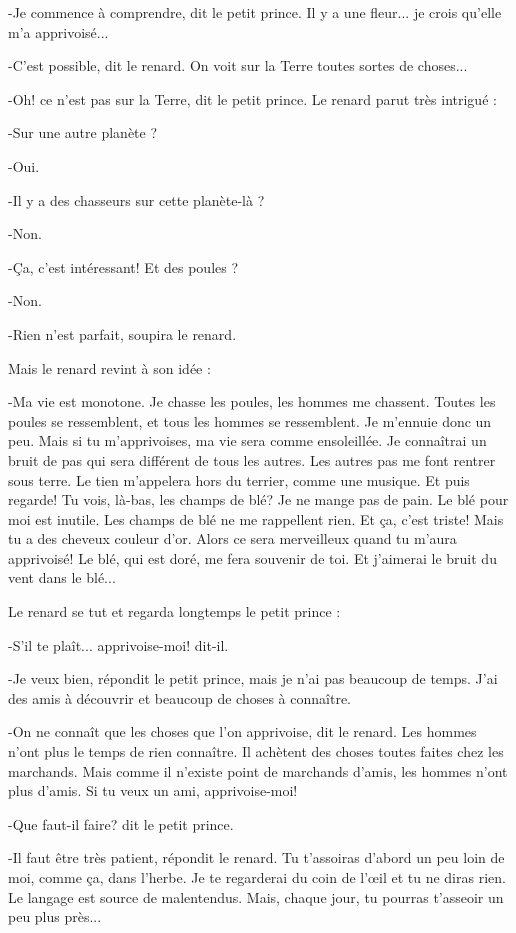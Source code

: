 \documentclass{report}
\begin{document}
-Je commence à comprendre, dit le petit prince. Il y a une fleur... je crois qu'elle m'a apprivoisé...

-C'est possible, dit le renard. On voit sur la Terre toutes sortes de choses...

-Oh! ce n'est pas sur la Terre, dit le petit prince. Le renard parut très intrigué :

-Sur une autre planète ?

-Oui.

-Il y a des chasseurs sur cette planète-là ?

-Non.

-Ça, c'est intéressant! Et des poules ?

-Non.

-Rien n'est parfait, soupira le renard.

Mais le renard revint à son idée :

-Ma vie est monotone. Je chasse les poules, les hommes me chassent. Toutes les poules se ressemblent, et tous les hommes se ressemblent. Je m'ennuie donc un peu. Mais si tu m'apprivoises, ma vie sera comme ensoleillée. Je connaîtrai un bruit de pas qui sera différent de tous les autres. Les autres pas me font rentrer sous terre. Le tien m'appelera hors du terrier, comme une musique. Et puis regarde! Tu vois, là-bas, les champs de blé? Je ne mange pas de pain. Le blé pour moi est inutile. Les champs de blé ne me rappellent rien. Et ça, c'est triste! Mais tu a des cheveux couleur d'or. Alors ce sera merveilleux quand tu m'aura apprivoisé! Le blé, qui est doré, me fera souvenir de toi. Et j'aimerai le bruit du vent dans le blé...

Le renard se tut et regarda longtemps le petit prince :

-S'il te plaît... apprivoise-moi! dit-il.

-Je veux bien, répondit le petit prince, mais je n'ai pas beaucoup de temps. J'ai des amis à découvrir et beaucoup de choses à connaître.

-On ne connaît que les choses que l'on apprivoise, dit le renard. Les hommes n'ont plus le temps de rien connaître. Il achètent des choses toutes faites chez les marchands. Mais comme il n'existe point de marchands d'amis, les hommes n'ont plus d'amis. Si tu veux un ami, apprivoise-moi!

-Que faut-il faire? dit le petit prince.

-Il faut être très patient, répondit le renard. Tu t'assoiras d'abord un peu loin de moi, comme ça, dans l'herbe. Je te regarderai du coin de l'œil et tu ne diras rien. Le langage est source de malentendus. Mais, chaque jour, tu pourras t'asseoir un peu plus près...
\end{document}
